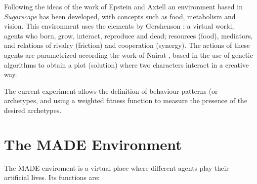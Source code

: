 \documentclass[runningheads]{llncs}
\begin{document}

Following the ideas of the work of Epstein and Axtell
\cite{epstein1996growing} an environment based in {\em Sugarscape} has
been developed, with concepts such as food, metabolism and
vision. This environment uses the elements by Gershenson %
\cite{gershenson2005general}: a virtual world, agents who born, grow,
interact, reproduce and dead; resources (food), mediators, and
relations of rivalry (friction) and cooperation (synergy). The actions
of these agents are parametrized according the work of Nairat
\cite{nairat2011character}, based in the use of genetic algorithms to
obtain a plot (solution) where two characters interact in a creative way.
 
The current experiment allows the definition of behaviour patterns (or
archetypes, and using a weighted fitness function to measure
the presence of the desired archetypes. 




\section{The MADE Environment}
\label{sec:made}

The MADE enviroment is a virtual place where different agents play their artificial lives. Its functions are:
\end{document}

